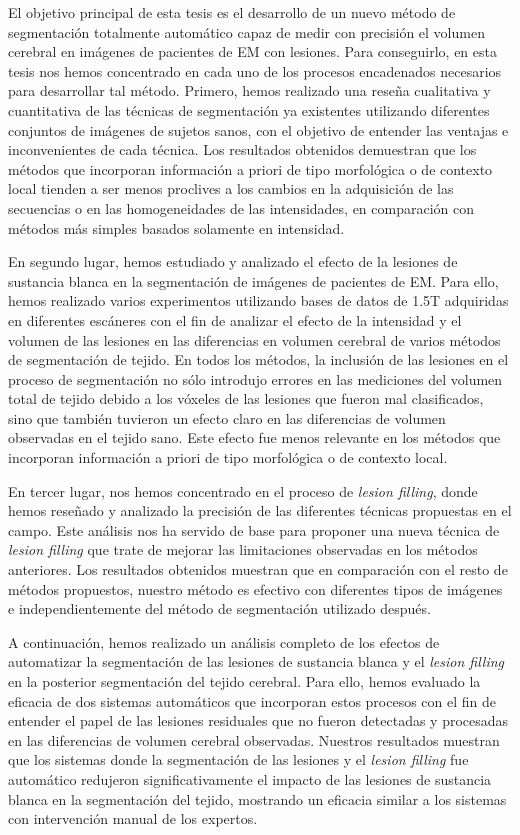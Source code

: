 El objetivo principal de esta tesis es el desarrollo de un nuevo método de segmentación totalmente automático capaz de medir con precisión el volumen cerebral en imágenes de pacientes de EM con lesiones. Para conseguirlo, en esta tesis nos hemos concentrado en cada uno de los procesos encadenados necesarios para desarrollar tal método. Primero, hemos realizado una reseña cualitativa y cuantitativa de las técnicas de segmentación ya existentes utilizando diferentes conjuntos de imágenes de sujetos sanos, con el objetivo de entender las ventajas e inconvenientes de cada técnica. Los resultados obtenidos demuestran que los métodos que incorporan información a priori de tipo morfológica o de contexto local tienden a ser menos proclives a los cambios en la adquisición de las secuencias o  en las homogeneidades de las intensidades, en comparación con métodos más simples basados solamente en intensidad.

En segundo lugar, hemos estudiado y analizado el efecto de la lesiones de sustancia blanca en la segmentación de imágenes de pacientes de EM. Para ello, hemos realizado varios experimentos utilizando bases de datos de 1.5T adquiridas en diferentes escáneres con el fin de analizar el efecto de la intensidad y el volumen de las lesiones en las diferencias en volumen cerebral de varios métodos de segmentación de tejido. En todos los métodos, la inclusión de las lesiones en el proceso de segmentación no sólo introdujo errores en las mediciones del volumen total de tejido debido a los vóxeles de las lesiones que fueron mal clasificados, sino que también tuvieron un efecto claro en las diferencias de volumen observadas en el tejido sano. Este efecto fue menos relevante en los métodos que incorporan información a priori de tipo morfológica o de contexto local.

En tercer lugar, nos hemos concentrado en el proceso de \textit{lesion filling}, donde hemos reseñado y analizado la precisión de las diferentes técnicas propuestas en el campo. Este análisis nos ha servido de base para proponer una nueva técnica de \textit{lesion filling} que trate de mejorar las limitaciones observadas en los métodos anteriores. Los resultados obtenidos muestran que en comparación con el resto de métodos propuestos, nuestro método es efectivo con diferentes tipos de imágenes e independientemente del método de segmentación utilizado después. 

A continuación, hemos realizado un análisis completo de los efectos de automatizar la segmentación de las lesiones de sustancia blanca y el \textit{lesion filling}  
en la posterior segmentación del tejido cerebral. Para ello, hemos evaluado la eficacia de dos sistemas automáticos que incorporan estos procesos con el fin de entender el papel de las lesiones residuales que no fueron detectadas y procesadas en las diferencias de volumen cerebral observadas. Nuestros resultados muestran que los sistemas donde la segmentación de las lesiones y el \textit{lesion filling} fue automático redujeron significativamente el impacto de las lesiones de sustancia blanca en la segmentación del tejido, mostrando un eficacia similar a los sistemas con intervención manual de los expertos. 

